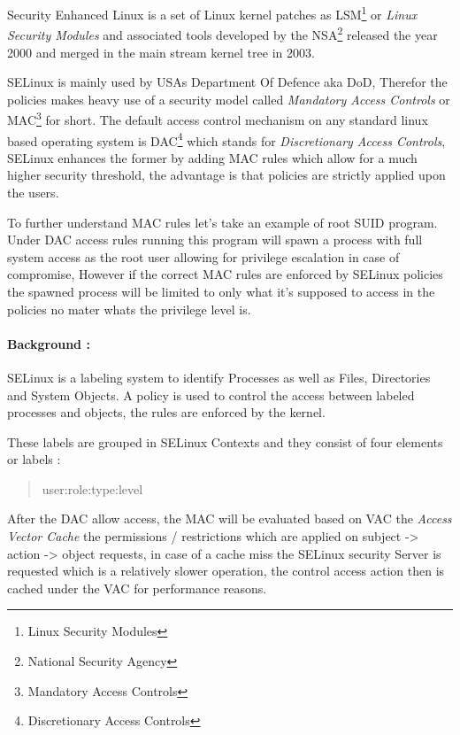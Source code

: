 \documentclass[
  14pt,
  english,
  a4paper,
]{scrreprt}
\begin{document}
Security Enhanced Linux is a set of Linux kernel patches as
LSM\footnote{Linux Security Modules} or \emph{Linux Security Modules}
and associated tools developed by the NSA\footnote{National Security
  Agency} released the year 2000 and merged in the main stream kernel
tree in 2003.

SELinux is mainly used by USAs Department Of Defence aka DoD, Therefor
the policies makes heavy use of a security model called \emph{Mandatory
Access Controls} or MAC\footnote{Mandatory Access Controls} for short.
The default access control mechanism on any standard linux based
operating system is DAC\footnote{Discretionary Access Controls} which
stands for \emph{Discretionary Access Controls}, SELinux enhances the
former by adding MAC rules which allow for a much higher security
threshold, the advantage is that policies are strictly applied upon the
users.

To further understand MAC rules let's take an example of root SUID
program. Under DAC access rules running this program will spawn a
process with full system access as the root user allowing for privilege
escalation in case of compromise, However if the correct MAC rules are
enforced by SELinux policies the spawned process will be limited to only
what it's supposed to access in the policies no mater whats the
privilege level is.

\hypertarget{background-3}{%
\paragraph{Background :}\label{background-3}}

SELinux is a labeling system to identify Processes as well as Files,
Directories and System Objects. A policy is used to control the access
between labeled processes and objects, the rules are enforced by the
kernel.

These labels are grouped in SELinux Contexts and they consist of four
elements or labels :

\begin{quote}
user:role:type:level
\end{quote}

After the DAC allow access, the MAC will be evaluated based on VAC the
\emph{Access Vector Cache} the permissions / restrictions which are
applied on subject -\textgreater{} action -\textgreater{} object
requests, in case of a cache miss the SELinux security Server is
requested which is a relatively slower operation, the control access
action then is cached under the VAC for performance reasons.
\end{document}
